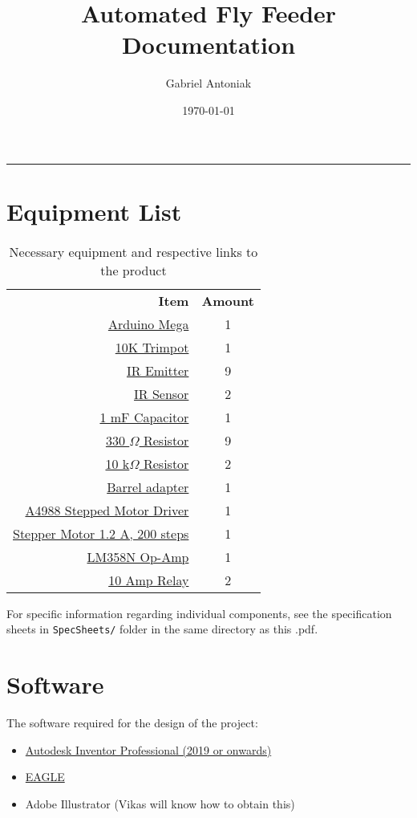 \documentclass[12pt]{article}
\title{Automated Fly Feeder Documentation}
\author{Gabriel Antoniak}
\date{\today}
\newcommand{\divider}{\vspace*{-4mm} \rule{\linewidth}{1pt} \vspace{-4pt} }
\begin{document}
\maketitle
\divider

\section{Equipment List}
\renewcommand{\arraystretch}{1.2}
\begin{table}[H]
	\centering
	\begin{tabular}{| r | c |} \toprule
		\textbf{Item}  & \textbf{Amount} \\ \cline{1-2}
		\href{https://store.arduino.cc/usa/arduino-mega-2560-rev3}{Arduino Mega}   &  1\\
		\href{https://www.sparkfun.com/products/9806}{10K Trimpot}    &  1\\
		\href{https://www.sparkfun.com/products/241}{IR Emitter}     &  9\\
		\href{https://www.sparkfun.com/products/241}{IR Sensor}      &  2\\
		\href{https://www.sparkfun.com/products/8982}{1 mF Capacitor} &  1\\
		\href{https://www.sparkfun.com/products/14490}{330 $\Omega$ Resistor} &  9\\ 
		\href{https://www.sparkfun.com/products/14491}{10 k$\Omega$ Resistor} &  2\\
		\href{https://www.sparkfun.com/products/10811}{Barrel adapter} &  1\\
		\href{https://www.pololu.com/product/2128}{A4988 Stepped Motor Driver} &  1\\
		\href{https://www.pololu.com/product/1200}{Stepper Motor 1.2 A, 200 steps} & 1\\
		\href{https://www.sparkfun.com/products/9456}{LM358N Op-Amp} & 1\\
		\href{https://www.sparkfun.com/products/13815}{10 Amp Relay}  & 2\\ \bottomrule
	\end{tabular}
	\caption{Necessary equipment and respective links to the product}
	\label{tbl:equipment}
\end{table}

For specific information regarding individual components, see the specification sheets in \texttt{SpecSheets/} folder in the same directory as this .pdf.

\section{Software}
The software required for the design of the project:
\begin{itemize}
	\item \href{https://www.autodesk.com/education/free-software/featured}{Autodesk Inventor Professional (2019 or onwards)}
	\item \href{https://www.autodesk.com/education/free-software/featured}{EAGLE}
	\item Adobe Illustrator (Vikas will know how to obtain this)
\end{itemize}
\end{document}
